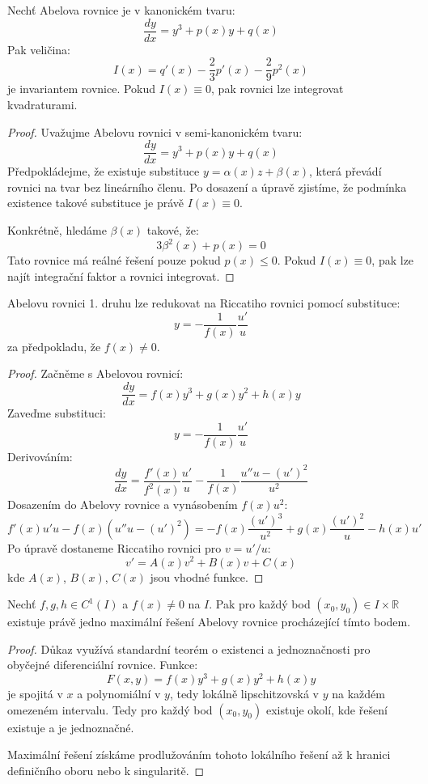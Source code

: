 \begin{theorem}
Nechť Abelova rovnice je v kanonickém tvaru:
\[
\frac{dy}{dx} = y^3 + p(x)y + q(x)
\]
Pak veličina:
\[
I(x) = q'(x) - \frac{2}{3}p'(x) - \frac{2}{9}p^2(x)
\]
je invariantem rovnice. Pokud $I(x) \equiv 0$, pak rovnici lze integrovat kvadraturami.
\end{theorem}

\begin{proof}
Uvažujme Abelovu rovnici v semi-kanonickém tvaru:
\[
\frac{dy}{dx} = y^3 + p(x)y + q(x)
\]
Předpokládejme, že existuje substituce $y = \alpha(x)z + \beta(x)$, která převádí rovnici na tvar bez lineárního členu. Po dosazení a úpravě zjistíme, že podmínka existence takové substituce je právě $I(x) \equiv 0$.

Konkrétně, hledáme $\beta(x)$ takové, že:
\[
3\beta^2(x) + p(x) = 0
\]
Tato rovnice má reálné řešení pouze pokud $p(x) \leq 0$. Pokud $I(x) \equiv 0$, pak lze najít integrační faktor a rovnici integrovat.
\end{proof}

\begin{theorem}
Abelovu rovnici 1. druhu lze redukovat na Riccatiho rovnici pomocí substituce:
\[
y = -\frac{1}{f(x)}\frac{u'}{u}
\]
za předpokladu, že $f(x) \neq 0$.
\end{theorem}

\begin{proof}
Začněme s Abelovou rovnicí:
\[
\frac{dy}{dx} = f(x)y^3 + g(x)y^2 + h(x)y
\]
Zaveďme substituci:
\[
y = -\frac{1}{f(x)}\frac{u'}{u}
\]
Derivováním:
\[
\frac{dy}{dx} = \frac{f'(x)}{f^2(x)}\frac{u'}{u} - \frac{1}{f(x)}\frac{u''u - (u')^2}{u^2}
\]
Dosazením do Abelovy rovnice a vynásobením $f(x)u^2$:
\[
f'(x)u'u - f(x)(u''u - (u')^2) = -f(x)\frac{(u')^3}{u^2} + g(x)\frac{(u')^2}{u} - h(x)u'
\]
Po úpravě dostaneme Riccatiho rovnici pro $v = u'/u$:
\[
v' = A(x)v^2 + B(x)v + C(x)
\]
kde $A(x)$, $B(x)$, $C(x)$ jsou vhodné funkce.
\end{proof}

\begin{theorem}
Nechť $f, g, h \in C^1(I)$ a $f(x) \neq 0$ na $I$. Pak pro každý bod $(x_0, y_0) \in I \times \mathbb{R}$ existuje právě jedno maximální řešení Abelovy rovnice procházející tímto bodem.
\end{theorem}

\begin{proof}
Důkaz využívá standardní teorém o existenci a jednoznačnosti pro obyčejné diferenciální rovnice. Funkce:
\[
F(x, y) = f(x)y^3 + g(x)y^2 + h(x)y
\]
je spojitá v $x$ a polynomiální v $y$, tedy lokálně lipschitzovská v $y$ na každém omezeném intervalu. Tedy pro každý bod $(x_0, y_0)$ existuje okolí, kde řešení existuje a je jednoznačné.

Maximální řešení získáme prodlužováním tohoto lokálního řešení až k hranici definičního oboru nebo k singularitě.
\end{proof}

